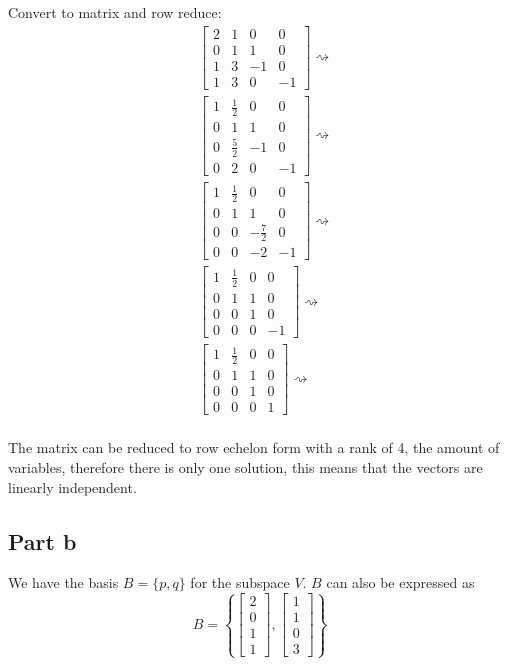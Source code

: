 Convert to matrix and row reduce:
\begin{align*}
	 & \begin{bmatrix}
		   2 & 1 & 0  & 0  \\
		   0 & 1 & 1  & 0  \\
		   1 & 3 & -1 & 0  \\
		   1 & 3 & 0  & -1
	   \end{bmatrix} \rightsquigarrow      \\
	 & \begin{bmatrix}
		   1 & \frac{1}{2} & 0  & 0  \\
		   0 & 1           & 1  & 0  \\
		   0 & \frac{5}{2} & -1 & 0  \\
		   0 & 2           & 0  & -1
	   \end{bmatrix} \rightsquigarrow      \\
	 & \begin{bmatrix}
		   1 & \frac{1}{2} & 0            & 0  \\
		   0 & 1           & 1            & 0  \\
		   0 & 0           & -\frac{7}{2} & 0  \\
		   0 & 0           & -2           & -1
	   \end{bmatrix} \rightsquigarrow \\
	 & \begin{bmatrix}
		   1 & \frac{1}{2} & 0 & 0  \\
		   0 & 1           & 1 & 0  \\
		   0 & 0           & 1 & 0  \\
		   0 & 0           & 0 & -1
	   \end{bmatrix} \rightsquigarrow      \\
	 & \begin{bmatrix}
		   1 & \frac{1}{2} & 0 & 0 \\
		   0 & 1           & 1 & 0 \\
		   0 & 0           & 1 & 0 \\
		   0 & 0           & 0 & 1
	   \end{bmatrix} \rightsquigarrow      \\
\end{align*}

The matrix can be reduced to row echelon form with a rank of 4, the amount of variables, therefore there is only one solution, this means that the vectors are linearly independent.

\subsection{Part b}
We have the basis $B = \{p,q\}$ for the subspace $V$. $B$ can also be expressed as
\[
	B = \left\{\begin{bmatrix}2\\0\\1\\1\end{bmatrix}, \begin{bmatrix}1\\1\\0\\3\end{bmatrix} \right\}
\]

